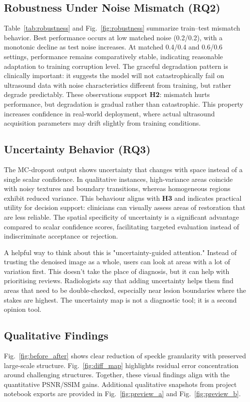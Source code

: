 \documentclass[conference]{IEEEtran}
\begin{document}
\subsection{Robustness Under Noise Mismatch (RQ2)}
Table~\ref{tab:robustness} and Fig.~\ref{fig:robustness} summarize train--test mismatch behavior. Best performance occurs at low matched noise (0.2/0.2), with a monotonic decline as test noise increases. At matched 0.4/0.4 and 0.6/0.6 settings, performance remains comparatively stable, indicating reasonable adaptation to training corruption level. The graceful degradation pattern is clinically important: it suggests the model will not catastrophically fail on ultrasound data with noise characteristics different from training, but rather degrade predictably. These observations support \textbf{H2}: mismatch hurts performance, but degradation is gradual rather than catastrophic. This property increases confidence in real-world deployment, where actual ultrasound acquisition parameters may drift slightly from training conditions.

\subsection{Uncertainty Behavior (RQ3)}
The MC-dropout output shows uncertainty that changes with space instead of a single scalar confidence. In qualitative instances, high-variance areas coincide with noisy textures and boundary transitions, whereas homogeneous regions exhibit reduced variance. This behaviour aligns with \textbf{H3} and indicates practical utility for decision support: clinicians can visually assess areas of restoration that are less reliable. The spatial specificity of uncertainty is a significant advantage compared to scalar confidence scores, facilitating targeted evaluation instead of indiscriminate acceptance or rejection.

A helpful way to think about this is "uncertainty-guided attention." Instead of trusting the denoised image as a whole, users can look at areas with a lot of variation first. This doesn't take the place of diagnosis, but it can help with prioritising reviews. Radiologists say that adding uncertainty helps them find areas that need to be double-checked, especially near lesion boundaries where the stakes are highest. The uncertainty map is not a diagnostic tool; it is a second opinion tool.

\subsection{Qualitative Findings}
Fig.~\ref{fig:before_after} shows clear reduction of speckle granularity with preserved large-scale structure. Fig.~\ref{fig:diff_map} highlights residual error concentration around challenging structures. Together, these visual findings align with the quantitative PSNR/SSIM gains. Additional qualitative snapshots from project notebook exports are provided in Fig.~\ref{fig:preview_a} and Fig.~\ref{fig:preview_b}.
\end{document}

